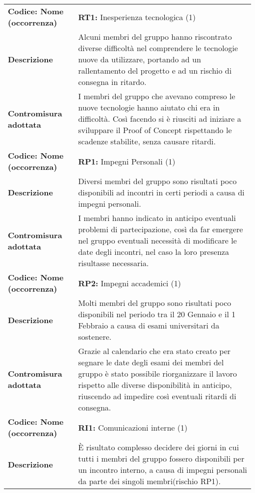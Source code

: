 \setcounter{table}{-1}
{


\centering
\renewcommand{\arraystretch}{1.5}
\begin{longtable}{C{3.5cm} | C{11cm}}
\textbf{Codice: Nome (occorrenza)} & \textbf{RT1: }{Inesperienza tecnologica (1)}\\
\textbf{Descrizione} & Alcuni membri del gruppo hanno riscontrato diverse difficoltà nel comprendere le tecnologie nuove da utilizzare, portando ad un rallentamento del progetto e ad un rischio di consegna in ritardo.\\
\textbf{Contromisura adottata} & I membri del gruppo che avevano compreso le nuove tecnologie hanno aiutato chi era in difficoltà. Così facendo si è riusciti ad iniziare a sviluppare il Proof of Concept rispettando le scadenze stabilite, senza causare ritardi.\\
\hline
{}\textbf{Codice: Nome (occorrenza)} & \textbf{RP1: }{Impegni Personali (1)}\\
\textbf{Descrizione} & Diversi membri del gruppo sono risultati poco disponibili ad incontri in certi periodi a causa di impegni personali.\\ 
\textbf{Contromisura adottata} & I membri hanno indicato in anticipo eventuali problemi di partecipazione, così da far emergere nel gruppo eventuali necessità di modificare le date degli incontri, nel caso la loro presenza risultasse necessaria.\\
\hline
\hline
{}\textbf{Codice: Nome (occorrenza)} & \textbf{RP2: }{Impegni accademici (1)}\\ 
\textbf{Descrizione} & Molti membri del gruppo sono risultati poco disponibili nel periodo tra il 20 Gennaio e il 1 Febbraio a causa di esami universitari da sostenere.\\
\textbf{Contromisura adottata} & Grazie al calendario che era stato creato per segnare le date degli esami dei membri del gruppo è stato possibile riorganizzare il lavoro rispetto alle diverse disponibilità in anticipo, riuscendo ad impedire così eventuali ritardi di consegna.\\
\hline
\hline
{}\textbf{Codice: Nome (occorrenza)} & \textbf{RI1: }{Comunicazioni interne (1)}\\
\textbf{Descrizione} & È risultato complesso decidere dei giorni in cui tutti i membri del gruppo fossero disponibili per un incontro interno, a causa di impegni personali da parte dei singoli membri(rischio RP1).\\ 

\end{longtable}}
